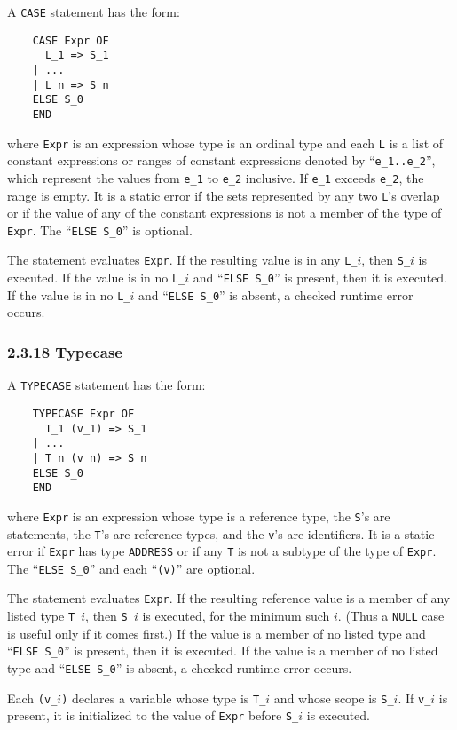 \documentclass[10pt]{article}
\begin{document}
A \verb|CASE| statement has the form:
\begin{verbatim}
    CASE Expr OF
      L_1 => S_1
    | ...
    | L_n => S_n
    ELSE S_0
    END
\end{verbatim}
where \verb|Expr| is an expression whose type is an ordinal type and each
\verb|L| is a list of constant expressions or ranges of constant expressions
denoted by ``\verb|e_1..e_2|'', which represent the values from \verb|e_1| to
\verb|e_2| inclusive.  If \verb|e_1| exceeds \verb|e_2|, the range is empty.
It is a static error if the sets represented by any two \verb|L|'s overlap or
if the value of any of the constant expressions is not a member of the type of
\verb|Expr|.  The ``\verb|ELSE S_0|'' is optional.

The statement evaluates \verb|Expr|.  If the resulting value is in any
\verb|L_|$i$, then \verb|S_|$i$ is executed.  If the value is in no
\verb|L_|$i$ and ``\verb|ELSE S_0|'' is present, then it is executed.  If the
value is in no \verb|L_|$i$ and ``\verb|ELSE S_0|'' is absent, a checked
runtime error occurs.

\subsubsection*{2.3.18 Typecase}

A \verb|TYPECASE| statement has the form:
\begin{verbatim}
    TYPECASE Expr OF
      T_1 (v_1) => S_1
    | ...
    | T_n (v_n) => S_n
    ELSE S_0
    END
\end{verbatim}
where \verb|Expr| is an expression whose type is a reference type, the
\verb|S|'s are statements, the \verb|T|'s are reference types, and the
\verb|v|'s are identifiers.  It is a static error if \verb|Expr| has type
\verb|ADDRESS| or if any \verb|T| is not a subtype of the type of \verb|Expr|.
The ``\verb|ELSE S_0|'' and each ``\verb|(v)|'' are optional.

The statement evaluates \verb|Expr|.  If the resulting reference value is a
member of any listed type \verb|T_|$i$, then \verb|S_|$i$ is executed, for the
minimum such $i$.  (Thus a \verb|NULL| case is useful only if it comes first.)
If the value is a member of no listed type and ``\verb|ELSE S_0|'' is present,
then it is executed.  If the value is a member of no listed type and
``\verb|ELSE S_0|'' is absent, a checked runtime error occurs.

Each \verb|(v_|$i$\verb|)| declares a variable whose type is \verb|T_|$i$ and
whose scope is \verb|S_|$i$.  If \verb|v_|$i$ is present, it is initialized to
the value of \verb|Expr| before \verb|S_|$i$ is executed.
\end{document}
